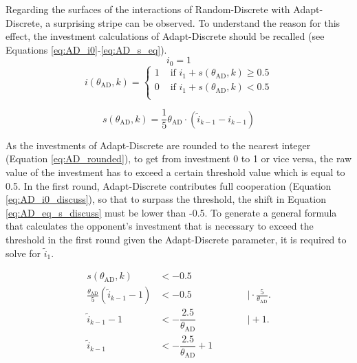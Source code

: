 \documentclass[11pt]{article}
\newcommand{\round}[1]{\ensuremath{\lfloor#1\rceil}}
\begin{document}
	Regarding the surfaces of the interactions of Random-Discrete with Adapt-Discrete, a surprising stripe can be observed.
	To understand the reason for this effect, the investment calculations of Adapt-Discrete should be recalled (see Equations \ref{eq:AD_i0}-\ref{eq:AD_s_eq}).
	\begin{equation}
		i_0 = 1
		\label{eq:AD_i0_discuss}
	\end{equation}
	\begin{equation}
		i(\theta_{\mathrm{AD}}, k) =
		\begin{cases}
			1 & \text{ if } i_1 + s(\theta_{\mathrm{AD}}, k) \ge 0.5\\
			0 & \text{ if } i_1 + s(\theta_{\mathrm{AD}}, k) < 0.5\\
		\end{cases}
		\label{eq:AD_rounded}
	\end{equation}

	\begin{equation}
		s(\theta_{\mathrm{AD}}, k) = \frac{1}{5} \theta_{\mathrm{AD}} \cdot (\tilde{i}_{k-1} - i_{k-1})
		\label{eq:AD_eq_s_discuss}
	\end{equation}

	\noindent
	As the investments of Adapt-Discrete are rounded to the nearest integer (Equation \ref{eq:AD_rounded}), to get from investment 0 to 1 or vice versa, the raw value of the investment has to exceed a certain threshold value which is equal to 0.5.
	In the first round, Adapt-Discrete contributes full cooperation (Equation \ref{eq:AD_i0_discuss}), so that to surpass the threshold, the shift in Equation \ref{eq:AD_eq_s_discuss} must be lower than -0.5.
	To generate a general formula that calculates the opponent's investment that is necessary to exceed the threshold in the first round given the Adapt-Discrete parameter, it is required to solve for $\tilde{i}_1$.

	\begin{equation}
\begin{alignedat}{2}
s(\theta_{\mathrm{AD}}, k)                           &< -0.5
  &\qquad& \\[5pt]
\frac{\theta_{\mathrm{AD}}}{5}(\tilde{i}_{k-1}-1)    &< -0.5
  &\qquad& \bigl|\cdot\frac{5}{\theta_{\mathrm{AD}}}\bigr.\\[5pt]
\tilde{i}_{k-1} - 1                                  &< -\dfrac{2.5}{\theta_{\mathrm{AD}}}
  &\qquad& \bigl|+1\bigr.\\[5pt]
\tilde{i}_{k-1}                                      &< -\dfrac{2.5}{\theta_{\mathrm{AD}}}+1
  &\qquad&
\end{alignedat}
\label{eq:adpd_inequality}
\end{equation}\\
\end{document}
